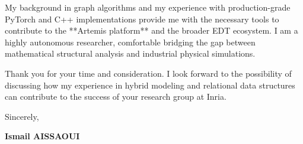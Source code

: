 \documentclass[a4paper,12pt]{article}
\begin{document}
My background in graph algorithms and my experience with production-grade PyTorch and C++ implementations provide me with the necessary tools to contribute to the **Artemis platform** and the broader EDT ecosystem. I am a highly autonomous researcher, comfortable bridging the gap between mathematical structural analysis and industrial physical simulations.

Thank you for your time and consideration. I look forward to the possibility of discussing how my experience in hybrid modeling and relational data structures can contribute to the success of your research group at Inria.

Sincerely,

\bigskip

\textbf{Ismail AISSAOUI}
\end{document}
